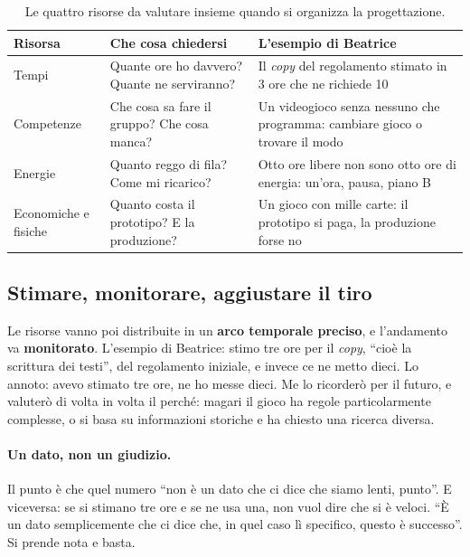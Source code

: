 \begin{table}[htbp]
\centering
\small
\begin{tabular}{@{}p{3cm}p{5.2cm}p{5.2cm}@{}}
\toprule
\textbf{Risorsa} & \textbf{Che cosa chiedersi} & \textbf{L'esempio di Beatrice} \\
\midrule
Tempi & Quante ore ho davvero? Quante ne serviranno? &
  Il \emph{copy} del regolamento stimato in 3 ore che ne richiede 10 \\
Competenze & Che cosa sa fare il gruppo? Che cosa manca? &
  Un videogioco senza nessuno che programma: cambiare gioco o trovare il modo \\
Energie & Quanto reggo di fila? Come mi ricarico? &
  Otto ore libere non sono otto ore di energia: un'ora, pausa, piano B \\
Economiche e fisiche & Quanto costa il prototipo? E la produzione? &
  Un gioco con mille carte: il prototipo si paga, la produzione forse no \\
\bottomrule
\end{tabular}
\caption{Le quattro risorse da valutare insieme quando si organizza la
progettazione.}
\label{a9:tab:risorse}
\end{table}

\subsection{Stimare, monitorare, aggiustare il tiro}
\label{a9:sec:monitorare}

Le risorse vanno poi distribuite in un \textbf{arco temporale preciso}, e
l'andamento va \textbf{monitorato}. L'esempio di Beatrice: stimo tre ore per il
\emph{copy}, ``cioè la scrittura dei testi'', del regolamento iniziale, e invece ce ne
metto dieci. Lo annoto: avevo stimato tre ore, ne ho messe dieci. Me lo ricorderò per
il futuro, e valuterò di volta in volta il perché: magari il gioco ha regole
particolarmente complesse, o si basa su informazioni storiche e ha chiesto una
ricerca diversa.

\paragraph{Un dato, non un giudizio.} Il punto è che quel numero ``non è un dato che
ci dice che siamo lenti, punto''. E viceversa: se si stimano tre ore e se ne usa una,
non vuol dire che si è veloci. ``È un dato semplicemente che ci dice che, in quel caso
lì specifico, questo è successo''. Si prende nota e basta.

